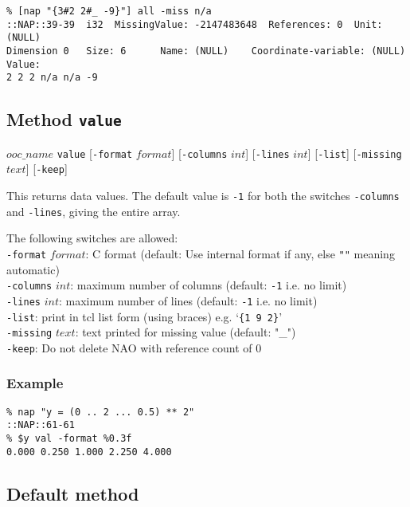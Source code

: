  \begin{verbatim}
% [nap "{3#2 2#_ -9}"] all -miss n/a
::NAP::39-39  i32  MissingValue: -2147483648  References: 0  Unit: (NULL)
Dimension 0   Size: 6      Name: (NULL)    Coordinate-variable: (NULL)
Value:
2 2 2 n/a n/a -9
\end{verbatim}

\subsection{Method \texttt{value}}
    \label{ooc-data-value}

  $ooc\_name$ 
  \texttt{value} 
  [\texttt{-format} $format$]
  [\texttt{-columns} $int$]
  [\texttt{-lines} $int$]
  [\texttt{-list}]
  [\texttt{-missing} $text$]
  [\texttt{-keep}]

This returns data values. The default value is 
  \texttt{-1} for both the switches 
  \texttt{-columns} and 
  \texttt{-lines}, giving the entire array.
  

The following switches are allowed:
  \\
  \texttt{-format} 
  $format$: C format (default: Use internal format if any,
  else \texttt{""} meaning automatic)
  \\
  \texttt{-columns} 
  $int$: maximum number of columns (default: 
  \texttt{-1} i.e. no limit)
  \\
  \texttt{-lines} 
  $int$: maximum number of lines (default: 
  \texttt{-1} i.e. no limit)
  \\
  \texttt{-list}: print in tcl list form (using braces) e.g. `\texttt{\{1 9 2\}}'
  \\
  \texttt{-missing} 
  $text$: text printed for missing value (default:
  "\_")
  \\
  \texttt{-keep}: Do not delete NAO with reference count of 0

\subsubsection{Example}

  \begin{verbatim}
% nap "y = (0 .. 2 ... 0.5) ** 2"
::NAP::61-61
% $y val -format %0.3f
0.000 0.250 1.000 2.250 4.000
\end{verbatim}

\subsection{Default method}
    \label{ooc-data-default-method}

